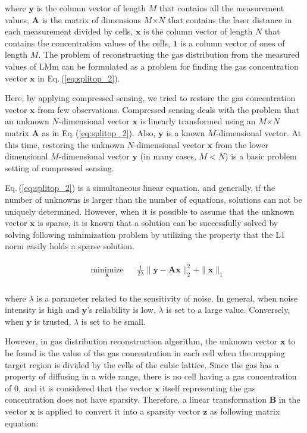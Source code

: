 \documentclass[fleqn,10pt,twocolumn]{SICE19}
\newcommand{\Eqref}[1]{Eq.\,(\ref{#1})}
\begin{document}
\noindent
where $\bm{y}$ is the column vector of length $M$ that contains all the measurement values, $\bm{A}$ is the matrix of dimensions $M$$\times$$N$ that contains the laser distance in each measurement divided by cells, $\bm{x}$ is the column vector of length $N$ that contains the concentration values of the cells, $\bm{1}$ is a column vector of ones of length $M$. The problem of reconstructing the gas distribution from the measured values of LMm can be formulated as a problem for finding the gas concentration vector $\bm{x}$ in \Eqref{eq:splitop_2}.

Here, by applying compressed sensing\cite{ref25}, we tried to restore the gas concentration vector $\bm{x}$ from few observations. Compressed sensing deals with the problem that an unknown $N$-dimensional vector $\bm{x}$ is linearly transformed using an $M$$\times$$N$ matrix $\bm{A}$ as in \Eqref{eq:splitop_2}. Also, $\bm{y}$ is a known $M$-dimensional vector. At this time, restoring the unknown $N$-dimensional vector $\bm{x}$ from the lower dimensional $M$-dimensional vector $\bm{y}$ (in many cases, $M$$<$$N$) is a basic problem setting of compressed sensing.

\Eqref{eq:splitop_2} is a simultaneous linear equation, and generally, if the number of unknowns is larger than the number of equations, solutions can not be uniquely determined. However, when it is possible to assume that the unknown vector $\bm{x}$ is sparse, it is known that a solution can be successfully solved by solving following minimization problem by utilizing the property that the L1 norm easily holds a sparse solution.

\begin{eqnarray}
  \label{eq:CS_2}
  \begin{aligned}
    & \underset{{\bm x}} {\text{minimize}} &&\frac{1}{2\lambda}\|\bm{y}-\bm{A}\bm{x}\|_2^2+\|\bm{x}\|_1\\
  \end{aligned}
\end{eqnarray}

\noindent
where $\lambda$ is a parameter related to the sensitivity of noise. In general, when noise intensity is high and $\bm{y}$'s reliability is low, $\lambda$ is set to a large value. Conversely, when $\bm{y}$ is trusted, $\lambda$ is set to be small.

However, in gas distribution reconstruction algorithm, the unknown vector $\bm{x}$ to be found is the value of the gas concentration in each cell when the mapping target region is divided by the cells of the cubic lattice. Since the gas has a property of diffusing in a wide range, there is no cell having a gas concentration of 0, and it is considered that the vector $\bm{x}$ itself representing the gas concentration does not have sparsity. Therefore, a linear transformation $\bm{B}$ in the vector $\bm{x}$ is applied to convert it into a sparsity vector $\bm{z}$ as following matrix equation:
\end{document}
